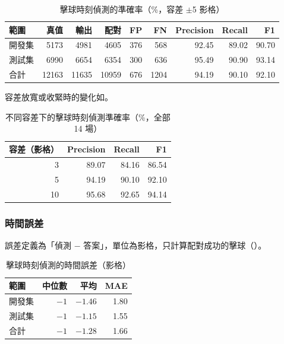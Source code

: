 \begin{table}[htbp]
  \centering
  \small
  \caption{擊球時刻偵測的準確率（\%，容差 $\pm$5 影格）}
  \label{tab:event-accuracy}
  \begin{tabular}{|l|r|r|r|r|r|r|r|r|}
    \hline
    範圍 & 真值 & 輸出 & 配對 & FP & FN & Precision & Recall & F1 \\ \hline
    開發集 & 5173 & 4981 & 4605 & 376 & 568 & 92.45 & 89.02 & 90.70 \\ \hline
    測試集 & 6990 & 6654 & 6354 & 300 & 636 & 95.49 & 90.90 & 93.14 \\ \hline
    合計 & 12163 & 11635 & 10959 & 676 & 1204 & 94.19 & 90.10 & 92.10 \\ \hline
  \end{tabular}
\end{table}

容差放寬或收緊時的變化如。

\begin{table}[htbp]
  \centering
  \small
  \caption{不同容差下的擊球時刻偵測準確率（\%，全部 14 場）}
  \label{tab:event-tolerance}
  \begin{tabular}{|r|r|r|r|}
    \hline
    容差（影格） & Precision & Recall & F1 \\ \hline
    3 & 89.07 & 84.16 & 86.54 \\ \hline
    5 & 94.19 & 90.10 & 92.10 \\ \hline
    10 & 95.68 & 92.65 & 94.14 \\ \hline
  \end{tabular}
\end{table}

\subsubsection{時間誤差}

誤差定義為「偵測 $-$ 答案」，單位為影格，只計算配對成功的擊球（）。

\begin{table}[htbp]
  \centering
  \small
  \caption{擊球時刻偵測的時間誤差（影格）}
  \label{tab:event-timing}
  \begin{tabular}{|l|r|r|r|}
    \hline
    範圍 & 中位數 & 平均 & MAE \\ \hline
    開發集 & $-1$ & $-1.46$ & 1.80 \\ \hline
    測試集 & $-1$ & $-1.15$ & 1.55 \\ \hline
    合計 & $-1$ & $-1.28$ & 1.66 \\ \hline
  \end{tabular}
\end{table}

